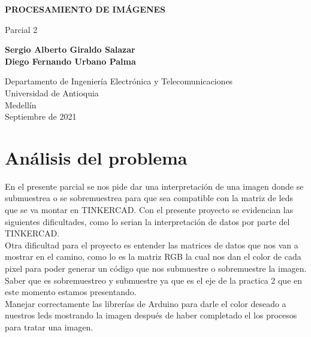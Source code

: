 \documentclass{article}
\begin{document}
\begin{titlepage}
    \begin{center}
        \vspace*{1cm}
            
        \Huge
        \textbf{PROCESAMIENTO DE IMÁGENES  }
            
        \vspace{0.5cm}
        \LARGE
        Parcial 2
            
        \vspace{1.5cm}
            
        \textbf{Sergio Alberto Giraldo  Salazar \\ Diego Fernando Urbano Palma }
        
        \vfill
            
        \vspace{0.8cm}
            
        \Large
        Departamento de Ingeniería Electrónica y Telecomunicaciones\\
        Universidad de Antioquia\\
        Medellín\\
        Septiembre de 2021
            
    \end{center}
\end{titlepage}

\tableofcontents
\newpage
\section{Análisis del problema}\label{intro}
En el presente parcial se nos pide dar una interpretación de una imagen donde se submuestrea o se sobremuestrea para que sea compatible con la matriz de leds que se va montar en TINKERCAD.
Con el presente proyecto se evidencian  las siguientes dificultades, como lo serian la interpretación de datos por parte del TINKERCAD.\\
Otra dificultad para el proyecto es entender las matrices de datos que nos van a mostrar en el camino, como lo es la matriz RGB la cual nos dan el color de cada pixel para poder generar un código que nos  submuestre o sobremuestre la imagen. \\Saber que es sobremuestreo  y submuestre ya que es el eje de la practica 2 que en este momento estamos presentando. \\
Manejar correctamente las librerías de Arduino para darle el color deseado a nuestros leds mostrando la imagen después de haber completado el los procesos para tratar una imagen.
\end{document}
